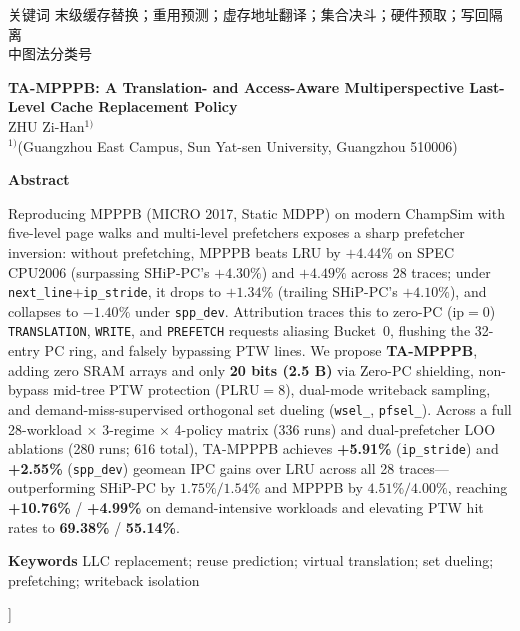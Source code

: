 \documentclass[10.5pt,compsoc,UTF8]{CjC}
\begin{document}
{{\noindent{}\heiti 关键词}\quad
{\songti 末级缓存替换；重用预测；虚存地址翻译；集合决斗；硬件预取；写回隔离}\\
{\noindent{}\heiti 中图法分类号} \qquad{}\\[2pt]

\begin{center}
{\bfseries TA-MPPPB: A Translation- and Access-Aware Multiperspective Last-Level Cache Replacement Policy}\\[0.12\baselineskip]
{ ZHU Zi-Han$^{1)}$}\\[0.04\baselineskip]
{ $^{1)}$(Guangzhou East Campus, Sun Yat-sen University, Guangzhou 510006)}
\end{center}
\vspace{1mm}

{\noindent{}\bfseries Abstract}\quad
{
Reproducing MPPPB (MICRO 2017, Static MDPP) on modern ChampSim with five-level page walks and multi-level prefetchers exposes a sharp prefetcher inversion: without prefetching, MPPPB beats LRU by $+4.44\%$ on SPEC CPU2006 (surpassing SHiP-PC's $+4.30\%$) and $+4.49\%$ across 28 traces; under \texttt{next\_line}+\texttt{ip\_stride}, it drops to $+1.34\%$ (trailing SHiP-PC's $+4.10\%$), and collapses to $-1.40\%$ under \texttt{spp\_dev}. Attribution traces this to zero-PC ($\mathrm{ip}=0$) \texttt{TRANSLATION}, \texttt{WRITE}, and \texttt{PREFETCH} requests aliasing Bucket~0, flushing the 32-entry PC ring, and falsely bypassing PTW lines. We propose \textbf{TA-MPPPB}, adding zero SRAM arrays and only \textbf{20 bits (2.5 B)} via Zero-PC shielding, non-bypass mid-tree PTW protection ($\mathrm{PLRU}=8$), dual-mode writeback sampling, and demand-miss-supervised orthogonal set dueling (\texttt{wsel\_}, \texttt{pfsel\_}). Across a full 28-workload $\times$ 3-regime $\times$ 4-policy matrix (336 runs) and dual-prefetcher LOO ablations (280 runs; 616 total), TA-MPPPB achieves \textbf{+5.91\%} (\texttt{ip\_stride}) and \textbf{+2.55\%} (\texttt{spp\_dev}) geomean IPC gains over LRU across all 28 traces—outperforming SHiP-PC by $1.75\%/1.54\%$ and MPPPB by $4.51\%/4.00\%$, reaching \textbf{+10.76\%} / \textbf{+4.99\%} on demand-intensive workloads and elevating PTW hit rates to \textbf{69.38\%} / \textbf{55.14\%}.\par}\vspace{3pt}

{\noindent{}\bfseries Keywords}\quad
{ LLC replacement; reuse prediction; virtual translation; set dueling; prefetching; writeback isolation}
\vspace{4pt}
}]
\end{document}
